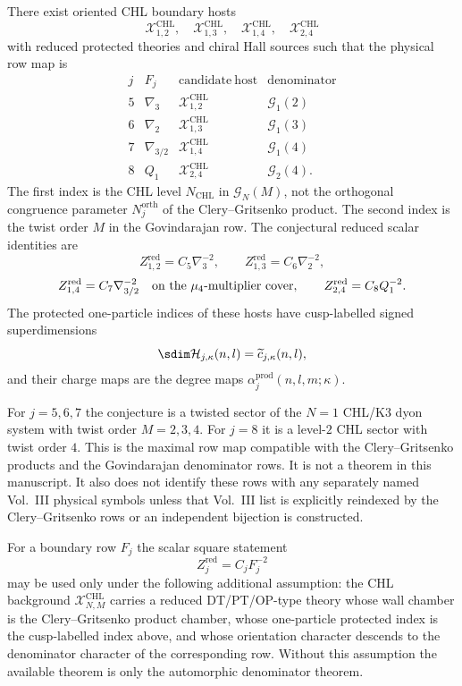 \begin{conjecture}
There exist oriented CHL boundary hosts
$$
\mathcal X_{1,2}^{\mathrm{CHL}},\quad
\mathcal X_{1,3}^{\mathrm{CHL}},\quad
\mathcal X_{1,4}^{\mathrm{CHL}},\quad
\mathcal X_{2,4}^{\mathrm{CHL}}
$$
with reduced protected theories and chiral Hall sources such that the
physical row map is
$$
\begin{array}{c|c|c|c}
j&F_j&\mathrm{candidate\ host}&\mathrm{denominator}\\ \hline
5&\nabla_3&\mathcal X_{1,2}^{\mathrm{CHL}}&\mathcal G_1(2)\\
6&\nabla_2&\mathcal X_{1,3}^{\mathrm{CHL}}&\mathcal G_1(3)\\
7&\nabla_{3/2}&\mathcal X_{1,4}^{\mathrm{CHL}}&\mathcal G_1(4)\\
8&Q_1&\mathcal X_{2,4}^{\mathrm{CHL}}&\mathcal G_2(4).
\end{array}
$$
The first index is the CHL level $N_{\mathrm{CHL}}$ in
$\mathcal G_N(M)$, not the orthogonal congruence parameter
$N_j^{\mathrm{orth}}$ of the Clery--Gritsenko product.  The second index
is the twist order $M$ in the Govindarajan row.  The conjectural reduced
scalar identities are
$$
Z_{1,2}^{\mathrm{red}}=C_5\nabla_3^{-2},\qquad
Z_{1,3}^{\mathrm{red}}=C_6\nabla_2^{-2},
$$
$$
Z_{1,4}^{\mathrm{red}}=C_7\nabla_{3/2}^{-2}
\quad\hbox{on the }\mu_4\hbox{-multiplier cover},
\qquad
Z_{2,4}^{\mathrm{red}}=C_8Q_1^{-2}.
$$
The protected one-particle indices of these hosts have cusp-labelled
signed superdimensions
$$
\sdim \mathcal H_{j,\kappa}(n,l)=\widetilde c_{j,\kappa}(n,l),
$$
and their charge maps are the degree maps
$\alpha_j^{\mathrm{prod}}(n,l,m;\kappa)$.
\end{conjecture}

\begin{remark}
For $j=5,6,7$ the conjecture is a twisted sector of the $N=1$ CHL/K3
dyon system with twist order $M=2,3,4$.  For $j=8$ it is a level-$2$
CHL sector with twist order $4$.  This is the maximal row map
compatible with the Clery--Gritsenko products and the Govindarajan
denominator rows.  It is not a theorem in this manuscript.  It also does
not identify these rows with any separately named Vol.~III physical
symbols unless that Vol.~III list is explicitly reindexed by the
Clery--Gritsenko rows or an independent bijection is constructed.
\end{remark}

\begin{assumption}
For a boundary row $F_j$ the scalar square statement
$$
Z_j^{\mathrm{red}}=C_jF_j^{-2}
$$
may be used only under the following additional assumption: the CHL
background $\mathcal X_{N,M}^{\mathrm{CHL}}$ carries a reduced
DT/PT/OP-type theory whose wall chamber is the Clery--Gritsenko product
chamber, whose one-particle protected index is the cusp-labelled index
above, and whose orientation character descends to the denominator
character of the corresponding row.  Without this assumption the
available theorem is only the automorphic denominator theorem.
\end{assumption}

